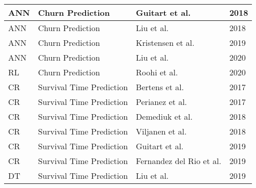 \begin{table}[h]
\begin{tabularx}{\textwidth}{|l|l|l|X|}
\hline
ANN                                      & Churn Prediction                   & Guitart et al. \cite{guitart2018winning}            & 2018                                \\ 
\hline
ANN                                      & Churn Prediction                   & Liu et al. \cite{liu2018semi}                       & 2018                                \\ 
\hline
ANN                                      & Churn Prediction                   & Kristensen et al. \cite{kristensen2019combining}    & 2019                                \\ 
\hline
ANN                                      & Churn Prediction                   & Liu et al. 
 \cite{liu2019micro}                    & 2020                                \\ 
\hline
RL                                       & Churn Prediction                   & Roohi et al. \cite{roohi2020predicting}             & 2020                                \\ 
\hline
CR                                       & Survival Time Prediction           & Bertens et al. \cite{bertens2017games}              & 2017                                \\ 
\hline
CR                                       & Survival Time Prediction           & Perianez et al. \cite{perianez2016churn}            & 2017                                \\ 
\hline
CR                                       & Survival Time Prediction           & Demediuk et al. \cite{demediuk2018player}           & 2018                                \\ 
\hline
CR                                       & Survival Time Prediction           & Viljanen et al. \cite{viljanen2018playtime}         & 2018                                \\ 
\hline
CR                                       & Survival Time Prediction           & Guitart et al. \cite{guitart2019understanding}      & 2019                                \\ 
\hline
CR                                       & Survival Time Prediction           & Fernandez del Rio et al. \cite{del2019profiling}    & 2019                                \\ 
\hline
DT                                       & Survival Time Prediction           & Liu et al. \cite{lee2018game}                       & 2019                                \\ 

\end{tabularx}
\end{table}
